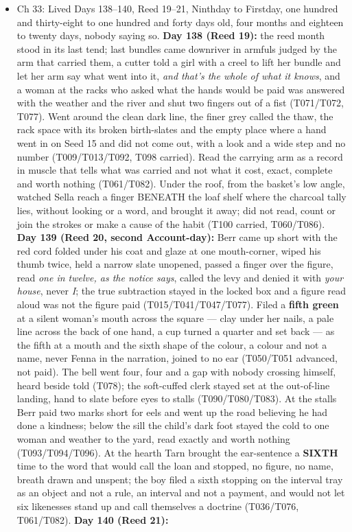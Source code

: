 \documentclass{design/chronicle}
\begin{document}
{\begin{itemize}[leftmargin=1.4em,itemsep=1pt,topsep=3pt,parsep=0pt]
\end{itemize}

\begin{itemize}[leftmargin=1.4em,itemsep=1pt,topsep=3pt,parsep=0pt]

\item Ch 33: Lived Days 138–140, Reed 19–21, Ninthday to Firstday, one hundred and thirty-eight to one hundred and forty days old, four months and eighteen to twenty days, nobody saying so. \textbf{Day 138 (Reed 19):} the reed month stood in its last tend; last bundles came downriver in armfuls judged by the arm that carried them, a cutter told a girl with a creel to lift her bundle and let her arm say what went into it, \emph{and that’s the whole of what it knows}, and a woman at the racks who asked what the hands would be paid was answered with the weather and the river and shut two fingers out of a fist (T071/T072, T077). Went around the clean dark line, the finer grey called the thaw, the rack space with its broken birth-slates and the empty place where a hand went in on Seed 15 and did not come out, with a look and a wide step and no number (T009/T013/T092, T098 carried). Read the carrying arm as a record in muscle that tells what was carried and not what it cost, exact, complete and worth nothing (T061/T082). Under the roof, from the basket’s low angle, watched Sella reach a finger BENEATH the loaf shelf where the charcoal tally lies, without looking or a word, and brought it away; did not read, count or join the strokes or make a cause of the habit (T100 carried, T060/T086). \textbf{Day 139 (Reed 20, second Account-day):} Berr came up short with the red cord folded under his coat and glaze at one mouth-corner, wiped his thumb twice, held a narrow slate unopened, passed a finger over the figure, read \emph{one in twelve, as the notice says}, called the levy and denied it with \emph{your house}, never \emph{I}; the true subtraction stayed in the locked box and a figure read aloud was not the figure paid (T015/T041/T047/T077). Filed a \textbf{fifth green} at a silent woman’s mouth across the square --- clay under her nails, a pale line across the back of one hand, a cup turned a quarter and set back --- as the fifth at a mouth and the sixth shape of the colour, a colour and not a name, never Fenna in the narration, joined to no ear (T050/T051 advanced, not paid). The bell went four, four and a gap with nobody crossing himself, heard beside told (T078); the soft-cuffed clerk stayed set at the out-of-line landing, hand to slate before eyes to stalls (T090/T080/T083). At the stalls Berr paid two marks short for eels and went up the road believing he had done a kindness; below the sill the child’s dark foot stayed the cold to one woman and weather to the yard, read exactly and worth nothing (T093/T094/T096). At the hearth Tarn brought the ear-sentence a \textbf{SIXTH} time to the word that would call the loan and stopped, no figure, no name, breath drawn and unspent; the boy filed a sixth stopping on the interval tray as an object and not a rule, an interval and not a payment, and would not let six likenesses stand up and call themselves a doctrine (T036/T076, T061/T082). \textbf{Day 140 (Reed 21):} 
\end{itemize}}
\end{document}
